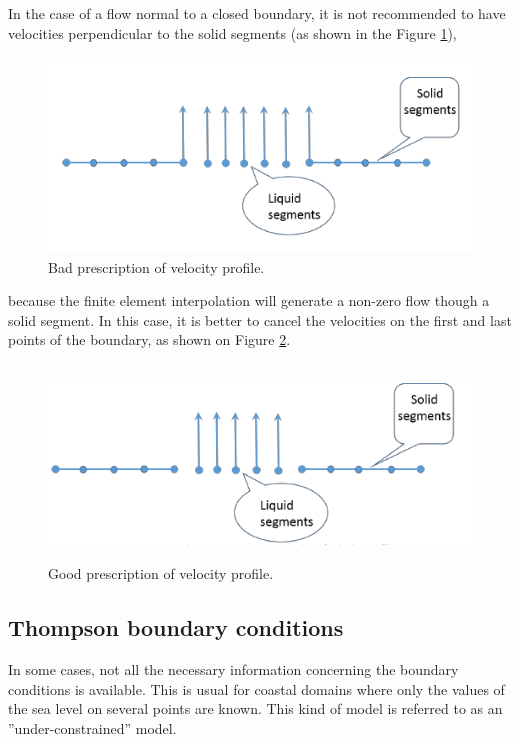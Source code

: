 In the case of a flow normal to a closed boundary, it is not recommended to have
velocities perpendicular to the solid segments
(as shown in the Figure \ref{bad:prescr:vel:prof}),
\begin{figure}
\includegraphics*[width=5.24in, height=2.04in, keepaspectratio=false]{./graphics/bad_profile.png}
\caption{Bad prescription of velocity profile.}
\label{bad:prescr:vel:prof}
\end{figure}

because the finite element interpolation will generate a non-zero flow
though a solid segment.
In this case, it is better to cancel the velocities on the first and last points
of the boundary, as shown on Figure \ref{good:presc:vel:prof}.

\begin{figure}
\includegraphics*[width=5.24in, height=2.04in, keepaspectratio=false]{./graphics/good_profile.png}
\caption{Good prescription of velocity profile.}
\label{good:presc:vel:prof}
\end{figure}


\subsection{Thompson boundary conditions}

In some cases, not all the necessary information concerning the boundary
conditions is available.
This is usual for coastal domains where only the values of the sea level
on several points are known.
This kind of model is referred to as an ''under-constrained'' model.

